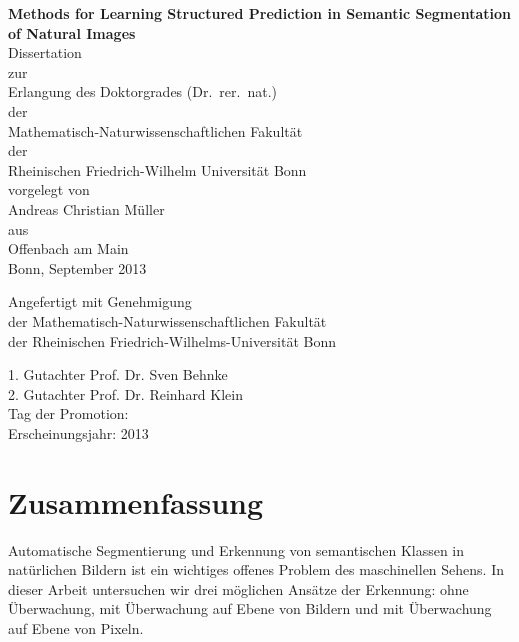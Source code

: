 \documentclass[12pt,toc=bibnumbered, a4paper,twoside,DIV=11,BCOR=.5cm]{scrbook}
\begin{document}
\begin{spacing}{1.6}
\begin{titlepage}

\begin{center}
\Large\sffamily
\vspace*{1cm}
\textbf{{\huge Methods for Learning Structured Prediction in Semantic Segmentation of Natural Images}}\\[5mm]
Dissertation\\
zur\\
Erlangung des Doktorgrades (Dr.\ rer.\ nat.)\\
der\\
Mathematisch-Naturwissenschaftlichen Fakult\"at\\
der\\
Rheinischen Friedrich-Wilhelm Universit\"at Bonn\\
vorgelegt von\\
{\LARGE Andreas Christian M\"uller}\\
aus\\
Offenbach am Main\\
Bonn, September 2013
\end{center}
\end{titlepage}
%
\clearpage
{}
\setcounter{page}{2}
\vspace*{5cm}
\Large\sffamily
\begin{center}
Angefertigt mit Genehmigung\\
der Mathematisch-Naturwissenschaftlichen Fakult\"at\\
der Rheinischen Friedrich-Wilhelms-Universit\"at Bonn\\
\end{center}
1. Gutachter Prof. Dr. Sven Behnke\\
2. Gutachter Prof. Dr. Reinhard Klein\\
Tag der Promotion:\\
Erscheinungsjahr: 2013\\
\end{spacing}
\tableofcontents
\chapter*{Zusammenfassung}
\enlargethispage{10mm}
Automatische Segmentierung und Erkennung von semantischen Klassen in
nat\"urlichen Bildern ist ein wichtiges offenes Problem des maschinellen Sehens.
In dieser Arbeit untersuchen wir drei m\"oglichen Ans\"atze der Erkennung:
ohne \"Uberwachung, mit \"Uberwachung auf Ebene von Bildern und mit \"Uberwachung auf Ebene
von Pixeln.
\end{document}
